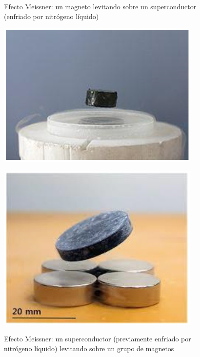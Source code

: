 \begin{figure}[H]
  \begin{minipage}[b]{0.47\textwidth}
Efecto Meissner: un magneto levitando sobre un superconductor (enfriado por nitrógeno líquido)
  \vspace{1.0cm}
  \end{minipage}
  \hfill
  \begin{minipage}[b]{0.47\textwidth}
     \includegraphics[width=0.9\textwidth]{./Figures/fig414}
	\label{fig:44}
	  \vspace{0.0cm}
  \end{minipage}
\end{figure}


\begin{figure}[H]
  \begin{minipage}[b]{0.47\textwidth}
     \includegraphics[width=0.9\textwidth]{./Figures/fig415}
	\label{fig:415}
	  \vspace{0.0cm}
  \end{minipage}
   \hfill
  \begin{minipage}[b]{0.47\textwidth}
Efecto Meissner: un superconductor (previamente enfriado por nitrógeno líquido) levitando sobre un grupo de magnetos
  \vspace{1.0cm}
  \end{minipage}
\end{figure}



